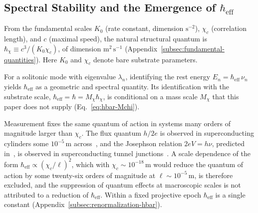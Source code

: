 \subsection{Spectral Stability and the Emergence of \texorpdfstring{$\hbar_{\mathrm{eff}}$}{ℏeff}}
\label{sec:hbar_eff_derivation}

From the fundamental scales $K_0$ (rate constant, dimension $\mathrm{s}^{-2}$), $\chi_c$ (correlation
length), and $c$ (maximal speed), the natural structural quantum is
$\hbar_\chi \equiv c^3/(K_0\chi_c)$, of dimension $\mathrm{m}^2\,\mathrm{s}^{-1}$
(Appendix~\ref{subsec:fundamental-quantities}).
Here $K_0$ and $\chi_c$ denote bare substrate parameters.

For a solitonic mode with eigenvalue $\lambda_n$, identifying the rest
energy $E_n = \hbar_{\mathrm{eff}}\,\nu_n$ yields
$\hbar_{\mathrm{eff}}$ as a geometric and spectral quantity.
Its identification with the substrate scale, $\hbar_{\mathrm{eff}} = \hbar = M_\chi\hbar_\chi$, is conditional on a
mass scale $M_\chi$ that this paper does not supply (Eq.~\eqref{eq:hbar-Mchi}).

Measurement fixes the same quantum of action in systems many orders of magnitude larger than $\chi_c$.
The flux quantum $h/2e$ is observed in superconducting cylinders some $10^{-5}\,\mathrm{m}$
across~\cite{DeaverFairbank1961,DollNabauer1961}, and the Josephson relation $2eV = h\nu$, predicted
in~\cite{Josephson1962}, is observed in superconducting tunnel junctions~\cite{Shapiro1963}.
A scale dependence of the form $\hbar_{\mathrm{eff}} \propto (\chi_c/\ell)^2$, which with
$\chi_c \sim 10^{-18}\,\mathrm{m}$ would reduce the quantum of action by some twenty-six orders of magnitude at
$\ell \sim 10^{-5}\,\mathrm{m}$, is therefore excluded, and the suppression of quantum effects at macroscopic scales
is not attributed to a reduction of $\hbar_{\mathrm{eff}}$.
Within a fixed projective epoch $\hbar_{\mathrm{eff}}$ is a single constant
(Appendix~\ref{subsec:renormalization-hbar}).
